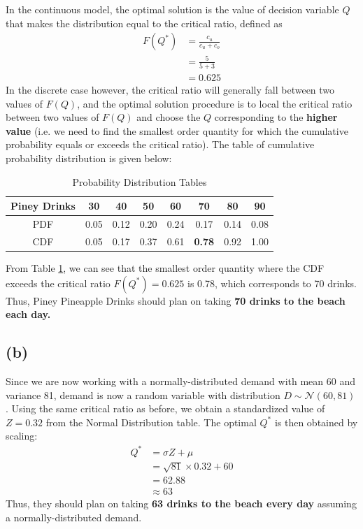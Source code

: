 \documentclass[12pt]{article}
\begin{document}
\noindent In the continuous model, the optimal solution is the value of decision variable $Q$ that makes the distribution equal to the critical ratio, defined as \begin{align*}
    F(Q^{*}) &= \frac{c_u}{c_u + c_o} \\ 
    &= \frac{5}{5+3} \\ 
    &= 0.625
\end{align*} In the discrete case however, the critical ratio will generally fall between two values of $F(Q)$, and the optimal solution procedure is to local the critical ratio between two values of $F(Q)$ and choose the $Q$ corresponding to the \textbf{higher value} (i.e. we need to find the smallest order quantity for which the cumulative probability equals or exceeds the critical ratio). The table of cumulative probability distribution is given below: \begin{table}[H]
    \centering
    \begin{tabular}{|c|c|c|c|c|c|c|c|} \hline 
        Piney Drinks & 30 & 40 & 50 & 60 & \textbf{70} & 80 & 90 \\ \hline 
        PDF & 0.05 & 0.12 & 0.20 & 0.24 & 0.17 & 0.14 & 0.08 \\ \hline \hline 
        CDF & 0.05 & 0.17 & 0.37 & 0.61 & \textbf{0.78} & 0.92 & 1.00 \\ \hline 
    \end{tabular}
    \caption{Probability Distribution Tables}
    \label{tab:1-cumprob}
\end{table} 

\noindent From Table \ref{tab:1-cumprob}, we can see that the smallest order quantity where the CDF exceeds the critical ratio $F(Q^{*}) = 0.625$ is 0.78, which corresponds to 70 drinks. Thus, Piney Pineapple Drinks should plan on taking \textbf{70 drinks to the beach each day.}

\subsection*{(b)}   


Since we are now working with a normally-distributed demand with mean 60 and variance 81, demand is now a random variable with distribution $D \sim \mathcal{N}(60, 81)$. Using the same critical ratio as before, we obtain a standardized value of $Z = 0.32$ from the Normal Distribution table. The optimal $Q^{*}$ is then obtained by scaling: \begin{align*}
    Q^{*} &= \sigma Z + \mu \\ 
    &= \sqrt{81} \times 0.32 + 60 \\ 
    &= 62.88 \\ 
    &\approx \boxed{63}
\end{align*} Thus, they should plan on taking \textbf{63 drinks to the beach every day} assuming a normally-distributed demand.
\end{document}
